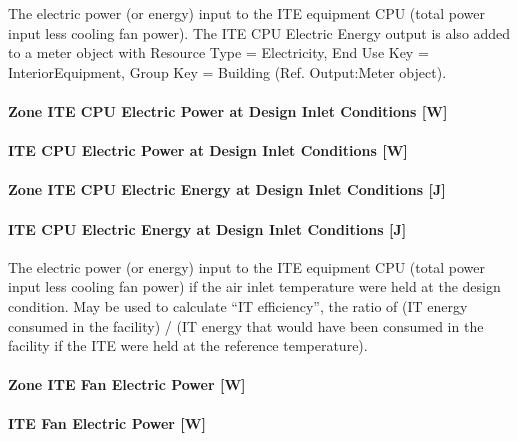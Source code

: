 The electric power (or energy) input to the ITE equipment CPU (total power input less cooling fan power). The ITE CPU Electric Energy output is also added to a meter object with Resource Type = Electricity, End Use Key = InteriorEquipment, Group Key = Building (Ref. Output:Meter object).

\paragraph{Zone ITE CPU Electric Power at Design Inlet Conditions {[}W{]}}\label{zone-ite-cpu-electric-power-at-design-inlet-conditions-w}

\paragraph{ITE CPU Electric Power at Design Inlet Conditions {[}W{]}}\label{ite-cpu-electric-power-at-design-inlet-conditions-w}

\paragraph{Zone ITE CPU Electric Energy at Design Inlet Conditions {[}J{]}}\label{zone-ite-cpu-electric-energy-at-design-inlet-conditions-j}

\paragraph{ITE CPU Electric Energy at Design Inlet Conditions {[}J{]}}\label{ite-cpu-electric-energy-at-design-inlet-conditions-j}

The electric power (or energy) input to the ITE equipment CPU (total power input less cooling fan power) if the air inlet temperature were held at the design condition. May be used to calculate ``IT efficiency'', the ratio of (IT energy consumed in the facility) / (IT energy that would have been consumed in the facility if the ITE were held at the reference temperature).

\paragraph{Zone ITE Fan Electric Power {[}W{]}}\label{zone-ite-fan-electric-power-w}

\paragraph{ITE Fan Electric Power {[}W{]}}\label{ite-fan-electric-power-w}

